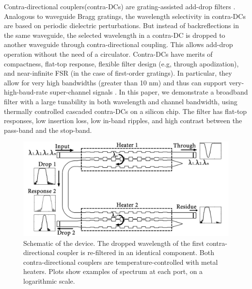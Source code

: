 \documentclass[osajnl,twocolumn,showpacs,superscriptaddress,10pt]{revtex4-1}
\begin{document}
Contra-directional couplers(contra-DCs) are grating-assisted add-drop filters \cite{shi2013siliconContraDC}. 
Analogous to waveguide Bragg gratings, the wavelength selectivity in contra-DCs are based on periodic dielectric perturbations. But instead of backreflections in the same waveguide, the selected wavelength in a contra-DC is dropped to another waveguide through contra-directional coupling.
This allows add-drop operation without the need of a circulator. 
Contra-DCs have merits of compactness, flat-top response, flexible filter design (e.g, through apodization), and near-infinite FSR (in the case of first-order gratings).
In particular, they allow for very high bandwidths (greater than 10 nm) and thus can support very-high-baud-rate super-channel signals \cite{jinno2009spectrum}.
In this paper, we demonstrate a broadband filter with a large tunability in both wavelength and channel bandwidth, using thermally controlled cascaded contra-DCs on a silicon chip. The filter has flat-top responses, low insertion loss, low in-band ripples, and high contrast between the pass-band and the stop-band.

\begin{figure}[htbp]
	\centering
	\includegraphics[width=1.00\columnwidth]{data/CascadedSchematic2}
	\centering
	\caption{Schematic of the device. The dropped wavelength of the first contra-directional coupler is re-filtered in an identical component. Both contra-directional couplers are temperature-controlled with metal heaters. Plots show examples of spectrum at each port, on a logarithmic scale.}
	\label{fig:schematic}
\end{figure}
\end{document}

